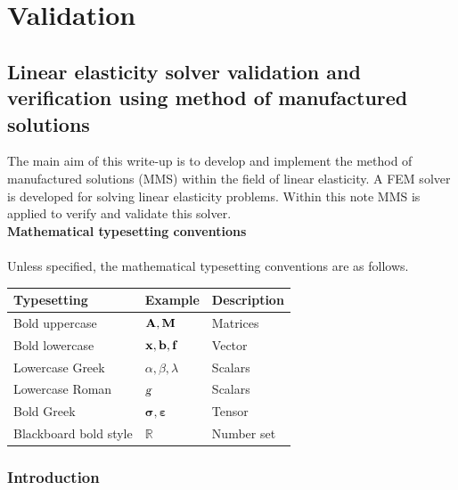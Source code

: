 \documentclass{report}
\newcommand{\bA}{\textbf{A}}
\newcommand{\bM}{\textbf{M}}
\newcommand{\bx}{\textbf{x}}
\newcommand{\bb}{\textbf{b}}
\newcommand{\bff}{\textbf{f}}
\newcommand{\sig}{\boldsymbol{\sigma}}
\newcommand{\eps}{\boldsymbol{\varepsilon}}
\def\bA{{{\bf{A}}}}
\def\bb{{\bf{b}}}
\def\bM{{\bf M}}
\def\bx{{\bf{x}}}
\begin{document}
%

\chapter{Validation}

\section{Linear elasticity solver validation and verification using method of manufactured solutions}
The main aim of this write-up is to develop and implement the method of manufactured solutions (MMS) within the field of linear elasticity. A FEM solver is developed for solving linear elasticity problems. Within this note MMS is applied to verify and validate this solver.\\

	\noindent\textbf{Mathematical typesetting conventions}\\\\
	\noindent Unless specified, the mathematical typesetting conventions are as follows.\\
	\begin{table}[h]
		\centering
			\begin{tabular}{p{}p{}p{} }
			\hline
			Typesetting &Example&Description\\
			\hline
			Bold uppercase & $\bA,\bM$& Matrices\\
			Bold lowercase & $\bx,\bb,\bff$& Vector\\
			Lowercase Greek   & $\alpha,\beta,\lambda$ & Scalars\\
			Lowercase Roman   & $\textsl{g}$ & Scalars\\			
			Bold Greek   & $\sig,\eps$ & Tensor\\
			Blackboard bold style   & $\mathbb{R}$ & Number set\\												
			\hline
		\end{tabular}
	\end{table}
	

\subsection{Introduction}
	
\end{document}

